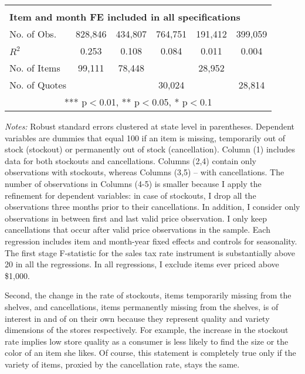 \documentclass[12pt]{article}
\begin{document}
\begin{table}[t]
\begin{threeparttable}
\begin{tabularx}{\textwidth}{lccccc}
					&          &          &          &          &  \\
					\multicolumn{6}{l}{\textbf{Item and month FE included in all specifications}} \\
					No. of Obs.               & 828,846  & 434,807  & 764,751  & 191,412  & 399,059                        \\
					$R^2$                     & 0.253    & 0.108    & 0.084    & 0.011    & 0.004                          \\
					No. of Items              & 99,111   & 78,448   &          & 28,952   &  \\ 
					No. of Quotes             &          &          & 30,024   &          & 28,814                         \\ \hline
					\multicolumn{6}{c}{ *** p$<$0.01, ** p$<$0.05, * p$<$0.1}
				\end{tabularx}
				\begin{tablenotes}
					\small \emph{Notes:} Robust standard errors clustered at state level in parentheses. Dependent variables are dummies that equal 100 if an item is missing, temporarily out of stock (stockout) or permanently out of stock (cancellation). Column (1) includes data for both stockouts and cancellations. Columns (2,4) contain only observations with stockouts, whereas Columns (3,5) -- with cancellations. The number of observations in Columns (4-5) is smaller because I apply the \citet{matsa} refinement for dependent variables: in case of stockouts, I drop all the observations three months prior to their cancellations. In addition, I consider only observations in between first and last valid price observation. I only keep cancellations that occur after valid price observations in the sample. Each regression includes item and month-year fixed effects and controls for seasonality. The first stage F-statistic for the sales tax rate instrument is substantially above 20 in all the regressions. In all regressions, I exclude items ever priced above \$1,000.
				\end{tablenotes}
			\end{threeparttable}
		\end{table}
		
	Second, the change in the rate of stockouts, items temporarily missing from the shelves, and cancellations, items permanently missing from the shelves, is of interest in and of on their own because they represent quality and variety dimensions of the stores respectively. For example, the increase in the stockout rate implies low store quality as a consumer is less likely to find the size or the color of an item she likes. Of course, this statement is completely true only if the variety of items, proxied by the cancellation rate, stays the same.
	
\end{document}
